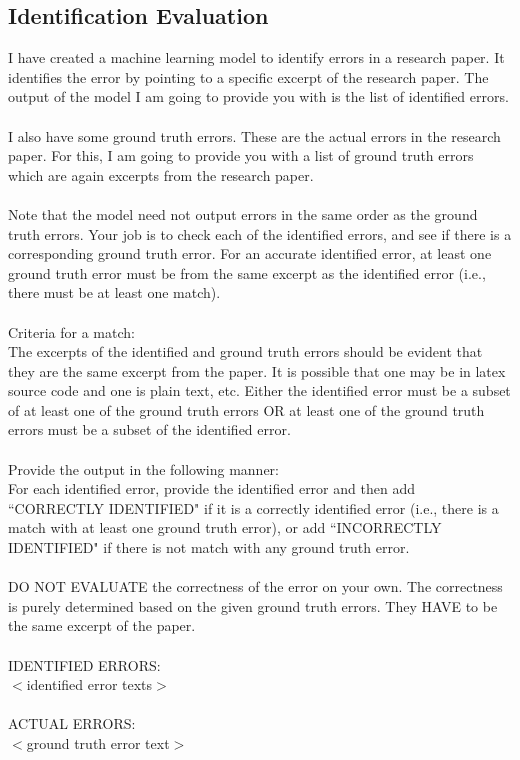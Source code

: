 \documentclass{article}
\begin{document}
\begin{appendix}
\subsection{Identification Evaluation}
\begin{tcolorbox}
[breakable, colback=black!5!white,colframe=black!20!white,title=\textbf{\textcolor{black}{Identification Evaluation Prompt}}]\label{appendix:error_evaluation}
\small
    I have created a machine learning model to identify errors in a research paper. It identifies the error by pointing to a specific excerpt of the research paper. The output of the model I am going to provide you with is the list of identified errors.\\
    \\
    I also have some ground truth errors. These are the actual errors in the research paper. For this, I am going to provide you with a list of ground truth errors which are again excerpts from the research paper.\\
    \\
    Note that the model need not output errors in the same order as the ground truth errors. Your job is to check each of the identified errors, and see if there is a corresponding ground truth error. For an accurate identified error, at least one ground truth error must be from the same excerpt as the identified error (i.e., there must be at least one match). \\
    \\
    Criteria for a match:\\
    The excerpts of the identified and ground truth errors should be evident that they are the same excerpt from the paper. It is possible that one may be in latex source code and one is plain text, etc. Either the identified error must be a subset of at least one of the ground truth errors OR at least one of the ground truth errors must be a subset of the identified error.\\
    \\
    Provide the output in the following manner:\\
    For each identified error, provide the identified error and then add ``CORRECTLY IDENTIFIED" if it is a correctly identified error (i.e., there is a match with at least one ground truth error), or add ``INCORRECTLY IDENTIFIED" if there is not match with any ground truth error.\\
    \\
    DO NOT EVALUATE the correctness of the error on your own. The correctness is purely determined based on the given ground truth errors. They HAVE to be the same excerpt of the paper.
    \\
    \\IDENTIFIED ERRORS:\\
    $<$identified error texts$>$\\
    \\
    ACTUAL ERRORS:\\
    $<$ground truth error text$>$\\
\end{tcolorbox}


\end{appendix}
\end{document}
